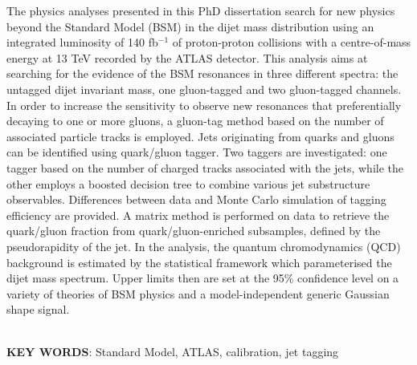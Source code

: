 \documentclass[UTF8,12pt]{ctexart}
\numberwithin{equation}{section}
\renewcommand{\rm}{\mathrm}
\def\vs{\vspace*{1mm}}
\def\ifb{fb$^{-1}$ }
\begin{document}
The physics analyses presented in this PhD dissertation search for new physics beyond the Standard Model (BSM) in the dijet mass distribution using an integrated luminosity of 140 \ifb of proton-proton collisions with a centre-of-mass energy at 13 TeV recorded by the ATLAS detector. This analysis aims at searching for the evidence of the BSM resonances in three different spectra: the untagged dijet invariant mass, one gluon-tagged and two gluon-tagged channels. In order to increase the sensitivity to observe new resonances that preferentially decaying to one or more gluons, a gluon-tag method based on the number of associated particle tracks is employed. Jets originating from quarks and gluons can be identified using quark/gluon tagger. Two taggers are investigated: one tagger based on the number of charged tracks associated with the jets, while the other employs a boosted decision tree to combine various jet substructure observables. Differences between data and Monte Carlo simulation of tagging efficiency are provided. A matrix method is performed on data to retrieve the quark/gluon fraction from quark/gluon-enriched subsamples, defined by the pseudorapidity of the jet. In the analysis, the quantum chromodynamics (QCD) background is estimated by the statistical framework which parameterised the dijet mass spectrum. Upper limits then are set at the 95\% confidence level on a variety of theories of BSM physics and a model-independent generic Gaussian shape signal.





~\\ 
\textbf{KEY WORDS}: 
Standard Model, ATLAS, calibration, jet tagging


\newpage 




\renewcommand\contentsname{\textbf{Contents}}


\tableofcontents\thispagestyle{fancy}
\end{document}
